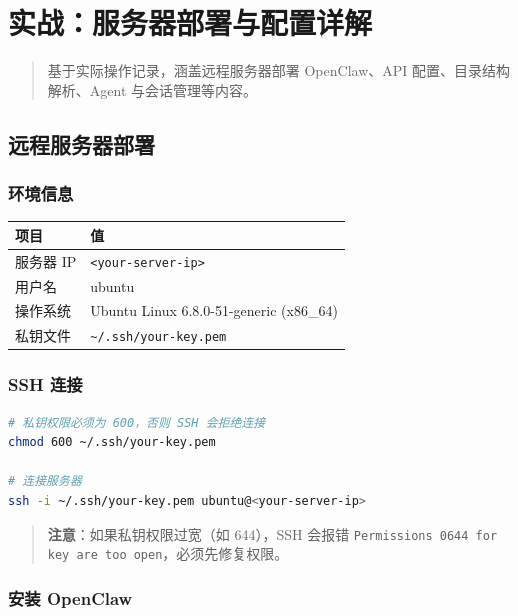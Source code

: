 \chapter{实战：服务器部署与配置详解}

\begin{quote}
基于实际操作记录，涵盖远程服务器部署 OpenClaw、API 配置、目录结构解析、Agent 与会话管理等内容。
\end{quote}

\section{远程服务器部署}


\subsection{环境信息}


\begin{table}[h]
\centering
\small
\begin{tabular}{|l|l|}
\hline
项目 & 值 \\
\hline
服务器 IP & \texttt{<your-server-ip>} \\
\hline
用户名 & ubuntu \\
\hline
操作系统 & Ubuntu Linux 6.8.0-51-generic (x86\_64) \\
\hline
私钥文件 & \texttt{\textasciitilde{}/.ssh/your-key.pem} \\
\hline
\end{tabular}
\end{table}

\subsection{SSH 连接}


\begin{lstlisting}[language=bash]
# 私钥权限必须为 600，否则 SSH 会拒绝连接
chmod 600 ~/.ssh/your-key.pem

# 连接服务器
ssh -i ~/.ssh/your-key.pem ubuntu@<your-server-ip>
\end{lstlisting}

\begin{quote}
\textbf{注意}：如果私钥权限过宽（如 644），SSH 会报错 \texttt{Permissions 0644 for key are too open}，必须先修复权限。
\end{quote}

\subsection{安装 OpenClaw}

